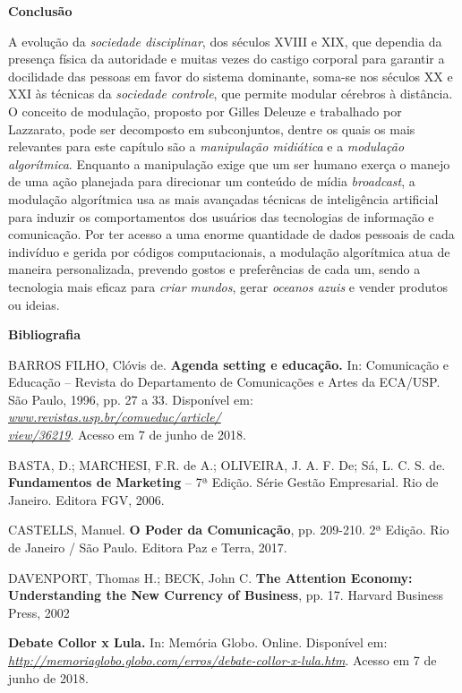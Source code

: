 \textbf{Conclusão}

A evolução da \emph{sociedade disciplinar}, dos séculos XVIII e XIX, que
dependia da presença física da autoridade e muitas vezes do castigo
corporal para garantir a docilidade das pessoas em favor do sistema
dominante, soma-se nos séculos XX e XXI às técnicas da \emph{sociedade
controle}, que permite modular cérebros à distância. O conceito de
modulação, proposto por Gilles Deleuze e trabalhado por Lazzarato, pode
ser decomposto em subconjuntos, dentre os quais os mais relevantes para
este capítulo são a \emph{manipulação midiática} e a \emph{modulação
algorítmica}. Enquanto a manipulação exige que um ser humano exerça o
manejo de uma ação planejada para direcionar um conteúdo de mídia
\emph{broadcast}, a modulação algorítmica usa as mais avançadas técnicas
de inteligência artificial para induzir os comportamentos dos usuários
das tecnologias de informação e comunicação. Por ter acesso a uma enorme
quantidade de dados pessoais de cada indivíduo e gerida por códigos
computacionais, a modulação algorítmica atua de maneira personalizada,
prevendo gostos e preferências de cada um, sendo a tecnologia mais
eficaz para \emph{criar mundos}, gerar \emph{oceanos azuis} e vender
produtos ou ideias.

\textbf{Bibliografia}

BARROS FILHO, Clóvis de. \textbf{Agenda setting e educação.} In:
Comunicação e Educação -- Revista do Departamento de Comunicações e
Artes da ECA/USP. São Paulo, 1996, pp. 27 a 33. Disponível em:
\emph{\href{http://www.revistas.usp.br/comueduc/article/}{www.revistas.usp.br/comueduc/article/}\href{http://www.revistas.usp.br/comueduc/article/view/36219}{\\
view/36219}}. Acesso em 7 de junho de 2018.

BASTA, D.; MARCHESI, F.R. de A.; OLIVEIRA, J. A. F. De; Sá, L. C. S. de.
\textbf{Fundamentos de Marketing} -- 7ª Edição. Série Gestão
Empresarial. Rio de Janeiro. Editora FGV, 2006.

CASTELLS, Manuel. \textbf{O Poder da Comunicação}, pp. 209-210. 2ª
Edição. Rio de Janeiro / São Paulo. Editora Paz e Terra, 2017.

DAVENPORT, Thomas H.; BECK, John C. \textbf{The Attention Economy:
Understanding the New Currency of Business}, pp. 17. Harvard Business
Press, 2002

\textbf{Debate Collor x Lula.} In: Memória Globo. Online. Disponível em:
\href{http://memoriaglobo.globo.com/erros/debate-collor-x-lula.htm}{\emph{http://memoriaglobo.globo.com/erros/debate-collor-x-lula.htm}}.
Acesso em 7 de junho de 2018.

